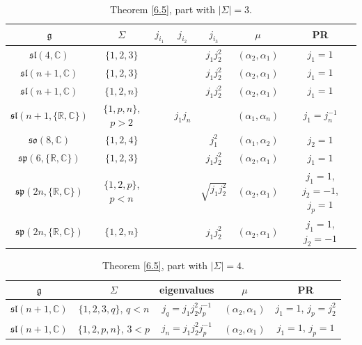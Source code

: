 \documentclass[10pt,a4paper]{amsart}
\newcommand{\Si}{\Sigma}
\newcommand{\fg}{\mathfrak g}
\numberwithin{equation}{section}
\begin{document}
\begin{table}[th!]\centering\caption{Theorem \ref{6.5}, part with $|\Si|=3$.}\label{ahs8}\vspace{1mm}

\begin{tabular}{|c|c|c|c|c|c|c|}
\hline
$\fg$ & $\Sigma$ & $j_{i_1}$& $j_{i_2}$& $j_{i_3}$&$\mu$&PR \\
\hline
\hline
$\mathfrak{sl}(4,\mathbb{C})$ &$\{1,2,3\}$& & & $j_1j_2^2 $ &$(\alpha_2,\alpha_1)$& $j_1=1$ \\
\hline
$\mathfrak{sl}(n+1,\mathbb{C})$ &$\{1,2,3\}$& & & $j_1j_2^2 $ &$(\alpha_2,\alpha_1)$& $j_1=1$ \\
\hline
$\mathfrak{sl}(n+1,\mathbb{C})$ &$\{1,2,n\}$& & & $j_1j_2^2 $ &$(\alpha_2,\alpha_1)$& $j_1=1$ \\
\hline
$\mathfrak{sl}(n+1,\{\mathbb{R, C}\})$&$\{1,p,n\}$, $p>2$ && $j_1j_n$& &$(\alpha_1,\alpha_n)$&$j_1=j_n^{-1}$ \\
\hline
$\mathfrak{so}(8,\mathbb{C})$& $\{1,2,4\}$&&& $j_1^2 $&$(\alpha_1,\alpha_2)$& $j_2=1$\\
\hline
$\mathfrak{sp}(6,\{\mathbb{R, C}\})$&$\{1,2,3\}$&&& $j_1j_2^2 $&$(\alpha_2,\alpha_1)$ &$j_1=1$\\
\hline
$\mathfrak{sp}(2n,\{\mathbb{R, C}\})$&$\{1,2,p\}$, $p<n$&& & $\sqrt{j_1j_2^2} $&$(\alpha_2,\alpha_1)$&$j_1=1$, $j_2=-1$, $j_p=1$ \\
\hline
$\mathfrak{sp}(2n,\{\mathbb{R, C}\})$&$\{1,2,n\}$&&& $j_1j_2^2 $&$(\alpha_2,\alpha_1)$ &$j_1=1$, $j_2=-1$\\
\hline
\end{tabular}
\end{table}

\begin{table}[th!]\centering\caption{Theorem \ref{6.5}, part with $|\Si|=4$.}\label{ahs9}\vspace{1mm}

\begin{tabular}{|c|c|c|c|c|}
\hline
$\fg$ & $\Sigma$ & eigenvalues& $\mu$& PR \\
\hline
\hline
$\mathfrak{sl}(n+1,\mathbb{C})$ & $\{1,2,3,q\}$, $q<n$&$j_q=j_1j_2^2j_p^{-1}$&$(\alpha_2,\alpha_1)$& $j_1=1$, $j_p=j_2^2$\\
\hline
$\mathfrak{sl}(n+1,\mathbb{C})$ & $\{1,2,p,n\}$, $3<p$&$j_n=j_1j_2^2j_p^{-1}$&$(\alpha_2,\alpha_1)$& $j_1=1$, $j_p=1$\\
\hline
\end{tabular}
\end{table}
\end{document}
